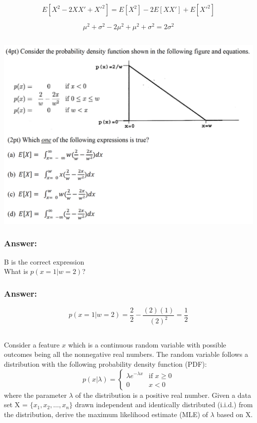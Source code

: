\documentclass{article}
\begin{document}
\begin{equation}
    E[X^2 - 2XX' + {X'}^2] = E[X^2] - 2E[XX'] + E[{X'}^2]
\end{equation}

\begin{equation}
    \mu^2 + \sigma^2 - 2\mu^2 + \mu^2 + \sigma^2 = 2\sigma^2
\end{equation}

\subsection{}
\includegraphics*[scale=.55]{./images/Q1P3P1.png}
\subsubsection{Answer:}
B is the correct expression
\\
What is $p(x = 1 | w = 2)$?

\subsubsection{Answer:}
\begin{equation}
    p(x = 1 | w = 2) = \frac{2}{2} - \frac{(2)(1)}{{(2)}^2} = \frac{1}{2}
\end{equation}

\subsection{}
Consider a feature $x$ which is a continuous random variable with possible outcomes being all the nonnegative real numbers. The random variable follows a distribution with the following probability density function (PDF):
\begin{equation}
    p(x | \lambda) =
    \begin{cases}
        \lambda e^{-\lambda x} & \text{if } x \geq 0 \\
        0 & x < 0
    \end{cases}
\end{equation}
where the parameter $\lambda$ of the distribution is a positive real number. Given a data set X = $\{x_1, x_2, \ldots, x_n\}$ drawn independent and identically distributed (i.i.d.) from the distribution, derive the maximum likelihood estimate (MLE) of $\lambda$ based on X.
\end{document}
